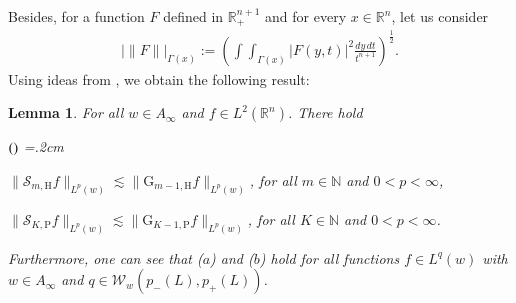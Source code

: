 \documentclass[11pt, a4paper,leqno]{amsart}
\theoremstyle{plain}
\newtheorem{lemma}[equation]{Lemma}
\theoremstyle{definition}
\theoremstyle{remark}
\numberwithin{equation}{section}
\def \R{ \mathbb{R} }
\def \N{ \mathbb{N} }
\def \Scal{ \mathcal{S} }
\def \hh{ \mathrm{H} }
\def \pp{ \mathrm{P} }
\def \Grm{ \mathrm{G} }
\def \iint{\int\!\!\!\int}
\begin{document}
Besides, for a function $F$ defined in $\R^{n+1}_+$ and for every $x\in \R^n$,   let us consider
\begin{align}\label{normacono}
|\|F\||_{\Gamma(x)}:=\left(\iint_{\Gamma(x)}|F(y,t)|^2\frac{dy\,dt}{t^{n+1}}\right)^{\frac{1}{2}}.
\end{align}
Using  ideas from \cite[Lemma 5.4]{HofmannMayboroda}, we obtain the  following result:
\begin{lemma}\label{lema:comparacion,SH-GH,SK-GK}
For all $w\in A_{\infty}$ and  $f\in L^{2}(\R^n)$.
There hold
\begin{list}{$(\theenumi)$}{\leftmargin=1cm \itemsep=0.2cm\topsep=.2cm \renewcommand{\theenumi}{\alph{enumi}}}

\item $\|\Scal_{m,\hh}f\|_{L^{p}(w)}\lesssim \|\Grm_{m-1,\hh}f\|_{L^{p}(w)}$,
for all $m\in \N$ and $0<p<\infty$,

\item  $\|\Scal_{K,\pp}f\|_{L^{p}(w)}\lesssim \|\Grm_{K-1,\pp}f\|_{L^{p}(w)}$, for all $K\in \N$ and $0<p<\infty$.
\end{list}
Furthermore, one can see that  ($a$) and ($b$) hold for all functions $f\in L^q(w)$ with $w\in A_\infty$ and $q\in \mathcal{W}_{w}(p_-(L), p_+(L))$. 

\end{lemma}
\end{document}
